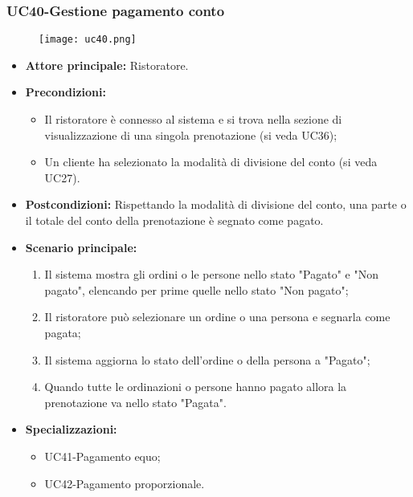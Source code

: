 \subsubsection{UC40-Gestione pagamento conto}
\begin{figure}[h] \texttt{[image: uc40.png]} \end{figure}
\begin{itemize}
    \item \textbf{Attore principale:} Ristoratore.
    \item \textbf{Precondizioni:}
    \begin{itemize}
        \item Il ristoratore è connesso al sistema e si trova nella sezione di visualizzazione di una singola prenotazione (si veda UC36);
        \item Un cliente ha selezionato la modalità di divisione del conto (si veda UC27).
    \end{itemize}
    \item \textbf{Postcondizioni:} Rispettando la modalità di divisione del conto, una parte o il totale del conto della prenotazione è segnato come pagato.
    \item \textbf{Scenario principale:}
    \begin{enumerate}
        \item Il sistema mostra gli ordini o le persone nello stato "Pagato" e "Non pagato", elencando per prime quelle nello stato "Non pagato";
        \item Il ristoratore può selezionare un ordine o una persona e segnarla come pagata;
        \item Il sistema aggiorna lo stato dell'ordine o della persona a "Pagato";
        \item Quando tutte le ordinazioni o persone hanno pagato allora la prenotazione va nello stato "Pagata".
    \end{enumerate}
    \item \textbf{Specializzazioni:}
        \begin{itemize}
            \item UC41-Pagamento equo;
            \item UC42-Pagamento proporzionale.
        \end{itemize}
\end{itemize}


